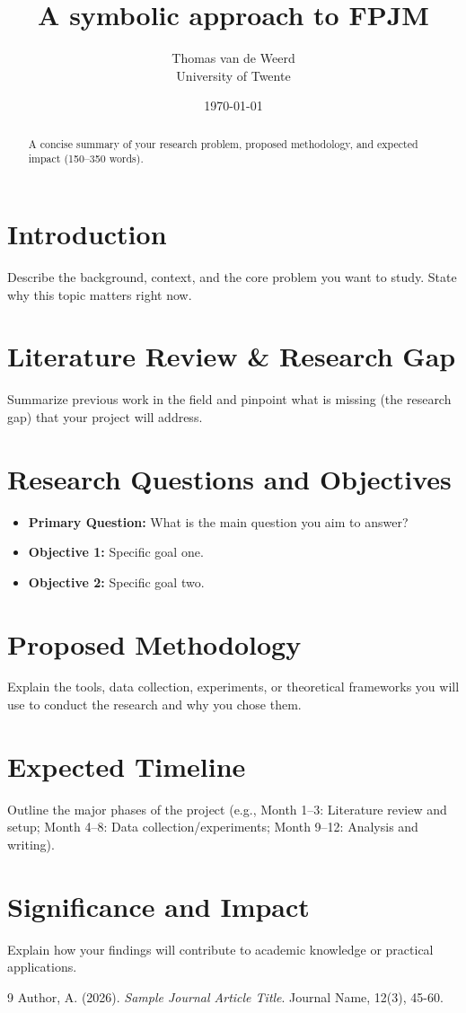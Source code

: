 \documentclass[11pt, a4paper]{article}
\title{A symbolic approach to FPJM}
\author{Thomas van de Weerd \\ \small University of Twente}
\date{\today}
\begin{document}
\maketitle

\begin{abstract}
A concise summary of your research problem, proposed methodology, and expected impact (150–350 words).
\end{abstract}

\section{Introduction}
\label{sec:intro}
Describe the background, context, and the core problem you want to study. State why this topic matters right now.

\section{Literature Review \& Research Gap}
\label{sec:litreview}
Summarize previous work in the field and pinpoint what is missing (the research gap) that your project will address.

\section{Research Questions and Objectives}
\label{sec:objectives}
\begin{itemize}
    \item \textbf{Primary Question:} What is the main question you aim to answer?
    \item \textbf{Objective 1:} Specific goal one.
    \item \textbf{Objective 2:} Specific goal two.
\end{itemize}

\section{Proposed Methodology}
\label{sec:methodology}
Explain the tools, data collection, experiments, or theoretical frameworks you will use to conduct the research and why you chose them.

\section{Expected Timeline}
\label{sec:timeline}
Outline the major phases of the project (e.g., Month 1–3: Literature review and setup; Month 4–8: Data collection/experiments; Month 9–12: Analysis and writing).

\section{Significance and Impact}
\label{sec:impact}
Explain how your findings will contribute to academic knowledge or practical applications.

\begin{thebibliography}{9}
Author, A. (2026). \emph{Sample Journal Article Title}. Journal Name, 12(3), 45-60.
\end{thebibliography}
\end{document}
